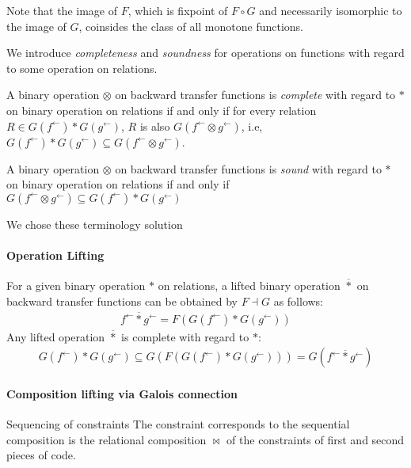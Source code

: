 \documentclass{llncs}
\newcommand{\fb}{{f^{\leftarrow}}}
\newcommand{\gb}{{g^{\leftarrow}}}
\newcommand{\comp}{\circ}
\newcommand{\starlift}{\mathbin{\overline{*}}}
\begin{document}
  Note that the image of $F$, which is fixpoint of $F \comp G$ and necessarily isomorphic to the image of $G$, coinsides the class of all monotone functions.

  We introduce \emph{completeness} and \emph{soundness} for operations on functions with regard to some operation on relations.
  \begin{definition}[Completeness]
   A binary operation $\otimes$ on backward transfer functions is \emph{complete} with regard to $*$ on binary operation on relations if and only if for every relation $R \in G(\fb) * G(\gb)$, $R$ is also $G (\fb \otimes \gb)$, i.e, $G(\fb) * G(\gb) \subseteq G (\fb \otimes \gb)$.
  \end{definition}

  \begin{definition}[Soundness]
  A binary operation $\otimes$ on backward transfer functions is \emph{sound} with regard to $*$ on binary operation on relations if and only if
  $G (\fb \otimes \gb) \subseteq G(\fb) * G(\gb)$
  \end{definition}

  We chose these terminology solution
  \paragraph{Operation Lifting}
  For a given binary operation $*$ on relations, a lifted binary operation $\starlift$ on backward transfer functions can be obtained by $F \dashv G$ as follows:
  \begin{align*}
  \fb \starlift \gb = F (G(\fb) * G(\gb))
  \end{align*}
  Any lifted operation $\starlift$ is complete with regard to $*$:
  \begin{align*}
  G(\fb) * G(\gb) \subseteq G(F(G(\fb) * G(\gb))) = G(\fb \starlift \gb)
  \end{align*}


\paragraph{Composition lifting via Galois connection}


  Sequencing of constraints
    The constraint corresponds to the sequential composition is the relational composition $\bowtie$ of the constraints of first and second pieces of code.
\end{document}
